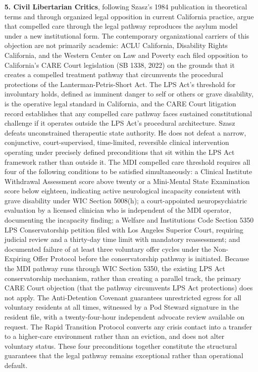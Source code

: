 \documentclass[12pt, letterpaper]{article}
\begin{document}
\textbf{5. Civil Libertarian Critics}, following Szasz's 1984 publication in theoretical terms and through organized legal opposition in current California practice, argue that compelled care through the legal pathway reproduces the asylum model under a new institutional form. The contemporary organizational carriers of this objection are not primarily academic: ACLU California, Disability Rights California, and the Western Center on Law and Poverty each filed opposition to California's CARE Court legislation (SB 1338, 2022) on the grounds that it creates a compelled treatment pathway that circumvents the procedural protections of the Lanterman-Petris-Short Act. The LPS Act's threshold for involuntary holds, defined as imminent danger to self or others or grave disability, is the operative legal standard in California, and the CARE Court litigation record establishes that any compelled care pathway faces sustained constitutional challenge if it operates outside the LPS Act's procedural architecture. Szasz defeats unconstrained therapeutic state authority. He does not defeat a narrow, conjunctive, court-supervised, time-limited, reversible clinical intervention operating under precisely defined preconditions that sit within the LPS Act framework rather than outside it. The MDI compelled care threshold requires all four of the following conditions to be satisfied simultaneously: a Clinical Institute Withdrawal Assessment score above twenty or a Mini-Mental State Examination score below eighteen, indicating active neurological incapacity consistent with grave disability under WIC Section 5008(h); a court-appointed neuropsychiatric evaluation by a licensed clinician who is independent of the MDI operator, documenting the incapacity finding; a Welfare and Institutions Code Section 5350 LPS Conservatorship petition filed with Los Angeles Superior Court, requiring judicial review and a thirty-day time limit with mandatory reassessment; and documented failure of at least three voluntary offer cycles under the Non-Expiring Offer Protocol before the conservatorship pathway is initiated. Because the MDI pathway runs through WIC Section 5350, the existing LPS Act conservatorship mechanism, rather than creating a parallel track, the primary CARE Court objection (that the pathway circumvents LPS Act protections) does not apply. The Anti-Detention Covenant guarantees unrestricted egress for all voluntary residents at all times, witnessed by a Pod Steward signature in the resident file, with a twenty-four-hour independent advocate review available on request. The Rapid Transition Protocol converts any crisis contact into a transfer to a higher-care environment rather than an eviction, and does not alter voluntary status. These four preconditions together constitute the structural guarantees that the legal pathway remains exceptional rather than operational default.
\end{document}
